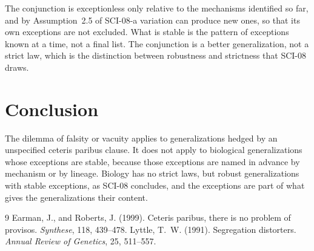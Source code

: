 \documentclass{situationist-preprint}
\begin{document}
\begin{reply}
The conjunction is exceptionless only relative to the mechanisms identified so far, and by Assumption~2.5 of SCI-08-a variation can produce new ones, so that its own exceptions are not excluded. What is stable is the pattern of exceptions known at a time, not a final list. The conjunction is a better generalization, not a strict law, which is the distinction between robustness and strictness that SCI-08 draws.
\end{reply}

\section{Conclusion}\label{s:conclusion}

The dilemma of falsity or vacuity applies to generalizations hedged by an unspecified ceteris paribus clause. It does not apply to biological generalizations whose exceptions are stable, because those exceptions are named in advance by mechanism or by lineage. Biology has no strict laws, but robust generalizations with stable exceptions, as SCI-08 concludes, and the exceptions are part of what gives the generalizations their content.

\begin{thebibliography}{9}
 Earman, J., and Roberts, J. (1999). Ceteris paribus, there is no problem of provisos. \emph{Synthese}, 118, 439--478.
 Lyttle, T.~W. (1991). Segregation distorters. \emph{Annual Review of Genetics}, 25, 511--557.
\end{thebibliography}
\end{document}
